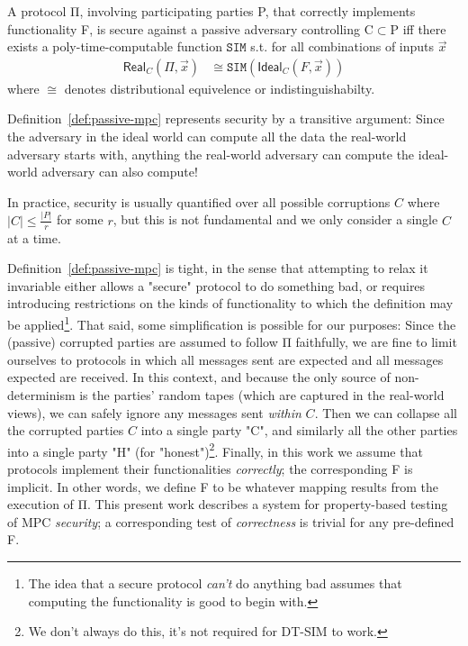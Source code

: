 \documentclass[compsoc, conference, a4paper, 10pt, times]{IEEEtran}
\newcommand{\toolname}{\textsc{DT-SIM}\xspace}
\begin{document}
\begin{definition}\label{def:passive-mpc}
    A protocol Π,
    involving participating parties P,
    that correctly implements functionality F,
    is secure against a passive adversary controlling C$\subset$P iff
    there exists a poly-time-computable function $\mathtt{SIM}$ s.t.
    for all combinations of inputs $\vec{x}$
    $$\begin{aligned}
        \mathsf{Real}_C(Π, \vec{x}) &\cong \mathtt{SIM}(\mathsf{Ideal}_C(F,\vec{x}))
    \end{aligned}$$
    where $\cong$ denotes distributional equivelence or indistinguishabilty.
\end{definition}

Definition~\ref{def:passive-mpc} represents security by a transitive argument:
Since the adversary in the ideal world can compute all the data the real-world adversary starts with,
anything the real-world adversary can compute the ideal-world adversary can also compute!

In practice, security is usually quantified over all possible corruptions $C$
where $\lvert C \rvert \leq \frac{\lvert P \rvert}{r}$ for some $r$, but this is not fundamental and we only consider a single $C$ at a time.

Definition~\ref{def:passive-mpc} is tight, in the sense that attempting to relax it invariable either
allows a "secure" protocol to do something bad, or requires introducing restrictions
on the kinds of functionality to which the definition may be applied\footnote{
    The idea that a secure protocol \textit{can't} do anything bad assumes that computing the functionality is good to begin with.
}.
That said, some simplification is possible for our purposes:
Since the (passive) corrupted parties are assumed to follow Π faithfully, we are fine to limit ourselves to
 protocols in which all messages sent are expected and all messages expected are received.
In this context, and because the only source of non-determinism is the parties' random tapes
(which are captured in the real-world views),
we can safely ignore any messages sent \textit{within} $C$.
Then we can collapse all the corrupted parties $C$ into a single party "C",
and similarly all the other parties into a single party "H" (for "honest")\footnote{
    We don't always do this, it's not required for \toolname to work.
}.
Finally, in this work we assume that protocols implement their functionalities \textit{correctly};
the corresponding F is implicit.
In other words, we define F to be whatever mapping results from the execution of Π.
This present work describes a system for property-based testing of MPC \textit{security};
a corresponding test of \textit{correctness} is trivial for any pre-defined F.
\end{document}
